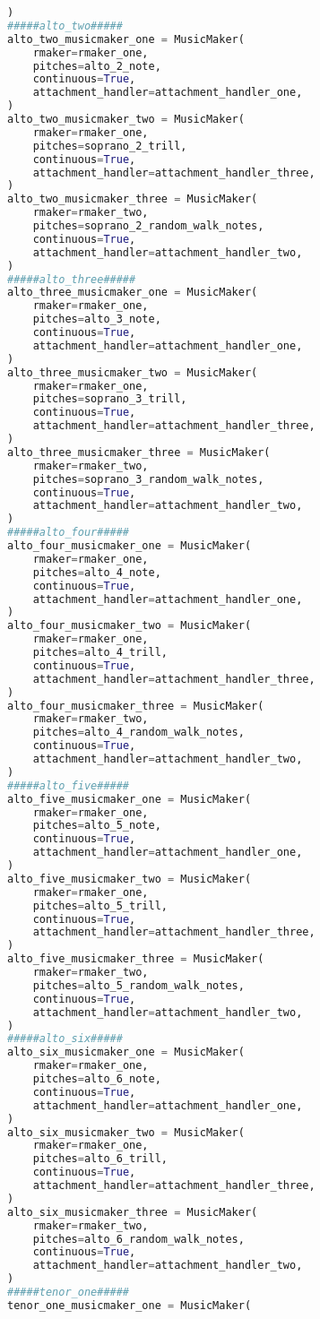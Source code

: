 \begin{lstlisting}[language=Python, caption=Invocation Source Code]
)
#####alto_two#####
alto_two_musicmaker_one = MusicMaker(
    rmaker=rmaker_one,
    pitches=alto_2_note,
    continuous=True,
    attachment_handler=attachment_handler_one,
)
alto_two_musicmaker_two = MusicMaker(
    rmaker=rmaker_one,
    pitches=soprano_2_trill,
    continuous=True,
    attachment_handler=attachment_handler_three,
)
alto_two_musicmaker_three = MusicMaker(
    rmaker=rmaker_two,
    pitches=soprano_2_random_walk_notes,
    continuous=True,
    attachment_handler=attachment_handler_two,
)
#####alto_three#####
alto_three_musicmaker_one = MusicMaker(
    rmaker=rmaker_one,
    pitches=alto_3_note,
    continuous=True,
    attachment_handler=attachment_handler_one,
)
alto_three_musicmaker_two = MusicMaker(
    rmaker=rmaker_one,
    pitches=soprano_3_trill,
    continuous=True,
    attachment_handler=attachment_handler_three,
)
alto_three_musicmaker_three = MusicMaker(
    rmaker=rmaker_two,
    pitches=soprano_3_random_walk_notes,
    continuous=True,
    attachment_handler=attachment_handler_two,
)
#####alto_four#####
alto_four_musicmaker_one = MusicMaker(
    rmaker=rmaker_one,
    pitches=alto_4_note,
    continuous=True,
    attachment_handler=attachment_handler_one,
)
alto_four_musicmaker_two = MusicMaker(
    rmaker=rmaker_one,
    pitches=alto_4_trill,
    continuous=True,
    attachment_handler=attachment_handler_three,
)
alto_four_musicmaker_three = MusicMaker(
    rmaker=rmaker_two,
    pitches=alto_4_random_walk_notes,
    continuous=True,
    attachment_handler=attachment_handler_two,
)
#####alto_five#####
alto_five_musicmaker_one = MusicMaker(
    rmaker=rmaker_one,
    pitches=alto_5_note,
    continuous=True,
    attachment_handler=attachment_handler_one,
)
alto_five_musicmaker_two = MusicMaker(
    rmaker=rmaker_one,
    pitches=alto_5_trill,
    continuous=True,
    attachment_handler=attachment_handler_three,
)
alto_five_musicmaker_three = MusicMaker(
    rmaker=rmaker_two,
    pitches=alto_5_random_walk_notes,
    continuous=True,
    attachment_handler=attachment_handler_two,
)
#####alto_six#####
alto_six_musicmaker_one = MusicMaker(
    rmaker=rmaker_one,
    pitches=alto_6_note,
    continuous=True,
    attachment_handler=attachment_handler_one,
)
alto_six_musicmaker_two = MusicMaker(
    rmaker=rmaker_one,
    pitches=alto_6_trill,
    continuous=True,
    attachment_handler=attachment_handler_three,
)
alto_six_musicmaker_three = MusicMaker(
    rmaker=rmaker_two,
    pitches=alto_6_random_walk_notes,
    continuous=True,
    attachment_handler=attachment_handler_two,
)
#####tenor_one#####
tenor_one_musicmaker_one = MusicMaker(

\end{lstlisting}
